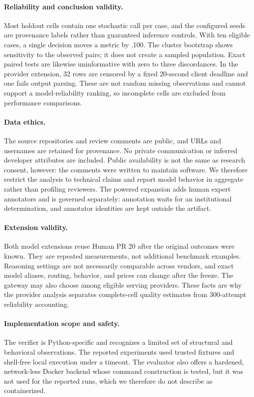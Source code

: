 \documentclass[acmsmall,screen,review,anonymous]{acmart}
\begin{document}
\paragraph{Reliability and conclusion validity.}
Most holdout cells contain one stochastic call per case, and the configured seeds are provenance labels rather than guaranteed inference controls. With ten eligible cases, a single decision moves a metric by .100. The cluster bootstrap shows sensitivity to the observed pairs; it does not create a sampled population. Exact paired tests are likewise uninformative with zero to three discordances. In the provider extension, 32 rows are censored by a fixed 20-second client deadline and one fails output parsing. These are not random missing observations and cannot support a model-reliability ranking, so incomplete cells are excluded from performance comparisons.

\paragraph{Data ethics.}
The source repositories and review comments are public, and URLs and usernames are retained for provenance. No private communication or inferred developer attributes are included. Public availability is not the same as research consent, however: the comments were written to maintain software. We therefore restrict the analysis to technical claims and report model behavior in aggregate rather than profiling reviewers. The powered expansion adds human expert annotators and is governed separately: annotation waits for an institutional determination, and annotator identities are kept outside the artifact.

\paragraph{Extension validity.}
Both model extensions reuse Human PR 20 after the original outcomes were known. They are repeated measurements, not additional benchmark examples. Reasoning settings are not necessarily comparable across vendors, and exact model aliases, routing, behavior, and prices can change after the freeze. The gateway may also choose among eligible serving providers. These facts are why the provider analysis separates complete-cell quality estimates from 300-attempt reliability accounting.

\paragraph{Implementation scope and safety.}
The verifier is Python-specific and recognizes a limited set of structural and behavioral observations. The reported experiments used trusted fixtures and shell-free local execution under a timeout. The evaluator also offers a hardened, network-less Docker backend whose command construction is tested, but it was not used for the reported runs, which we therefore do not describe as containerized.
\end{document}
